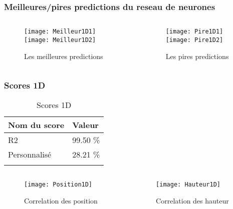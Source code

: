 \begin{frame}[fragile]
    \frametitle{Meilleures/pires predictions du reseau de neurones}

    \begin{columns}
    \begin{column}{0.5\textwidth}
        \begin{figure}
        \texttt{[image: Meilleur1D1]}       
        \texttt{[image: Meilleur1D2]}       
        \caption{Les meilleures predictions}
        \end{figure}
     \end{column}
     \begin{column}{0.5\textwidth}
        \begin{figure}
        \texttt{[image: Pire1D1]}       
        \texttt{[image: Pire1D2]}       
        \caption{Les pires predictions}
        \end{figure}
     \end{column}
    \end{columns}

\end{frame}

\begin{frame}
    \frametitle{Scores 1D}

    \begin{table}[h!]
        \caption{Scores 1D}
        \centering
        \begin{tabular}{l l}
        \toprule
        \textbf{Nom du score} & \textbf{Valeur} \\
        \midrule
        R2 & 99.50 \%\\
        Personnalisé & 28.21 \%\\
        \bottomrule\\
        \end{tabular}
    \end{table}

    \begin{columns}
        \begin{column}{0.5\textwidth}
            \begin{figure}
            \texttt{[image: Position1D]}       
            \caption{Correlation des position}
            \end{figure}
         \end{column}
         \begin{column}{0.5\textwidth}
            \begin{figure}
            \texttt{[image: Hauteur1D]}       
            \caption{Correlation des hauteur}
            \end{figure}
         \end{column}
    \end{columns}

\end{frame}


